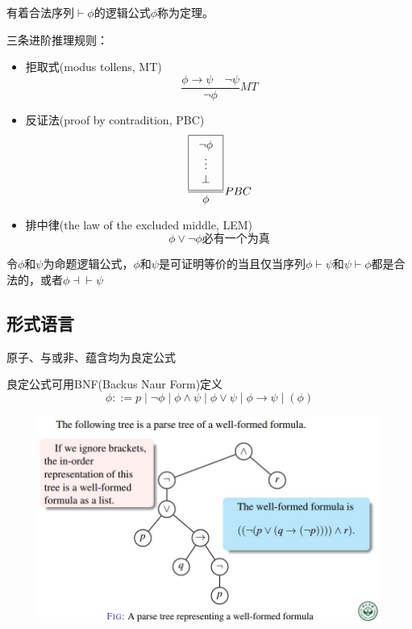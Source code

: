 \begin{definition}[定理(theorem)]
有着合法序列$\vdash\phi$的逻辑公式$\phi$称为定理。
\end{definition}

三条进阶推理规则：
\begin{itemize}
\item 拒取式(modus tollens, MT)
\[\frac{\phi\to\psi\quad \lnot\psi}{\lnot\phi} MT\]
\item 反证法(proof by contradition, PBC)
\[\frac{\fbox{\begin{tabular}{c}$\lnot\phi$\\$\vdots$\\$\bot$\end{tabular}}}{\phi} PBC\]
\item 排中律(the law of the excluded middle, LEM)
\[\phi\lor\lnot\phi\text{必有一个为真}\]
\end{itemize}

\begin{definition}
令$\phi$和$\psi$为命题逻辑公式，$\phi$和$\psi$是可证明等价的当且仅当序列$\phi\vdash\psi$和$\psi\vdash\phi$都是合法的，或者$\phi\dashv\vdash\psi$
\end{definition}

\subsection{形式语言}
\begin{definition}
原子、与或非、蕴含均为良定公式
\end{definition}
良定公式可用BNF(Backus Naur Form)定义
\[\phi::=p\mid
\lnot\phi\mid
\phi\land\psi\mid
\phi\lor\psi\mid
\phi\to\psi\mid
(\phi)\]
\begin{figure}[H]
\centering
\includegraphics[width=0.8\linewidth]{fig/well-formed_formula.jpg}
\end{figure}

